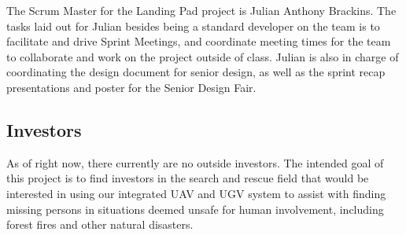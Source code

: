 The Scrum Master for the Landing Pad project is Julian Anthony Brackins. The tasks laid out for Julian besides being a standard developer on the team is to facilitate and drive Sprint Meetings, and coordinate meeting times for the team to collaborate and work on the project outside of class. Julian is also in charge of coordinating the design document for senior design, as well as the sprint recap presentations and poster for the Senior Design Fair.


\subsection{Investors}
As of right now, there currently are no outside investors. The intended goal of this project is to find investors in the search and rescue field that would be interested in using our integrated UAV and UGV system to assist with finding missing persons in situations deemed unsafe for human involvement, including forest fires and other natural disasters.

